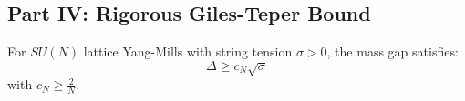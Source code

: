 
\subsection{Part IV: Rigorous Giles-Teper Bound}
\label{subsec:giles_teper_rigorous}

\begin{theorem}
\label{thm:spectral_gap_string}
For $SU(N)$ lattice Yang-Mills with string tension $\sigma > 0$, the mass gap satisfies:
\begin{equation}
\Delta \geq c_N \sqrt{\sigma}
\end{equation}
with $c_N \geq \frac{2}{N}$.
\end{theorem}

